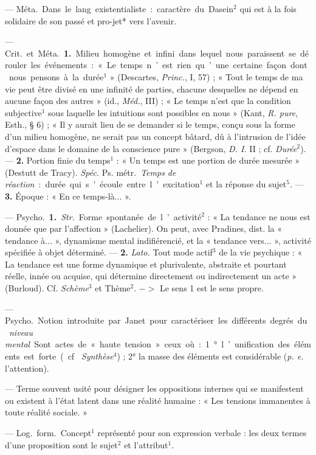 \begin{itemize}[leftmargin=1cm, label=, itemsep=1pt]
 — \si{Méta.} Dans le lang. existentialiste : caractère du
Dasein$^2$ qui est à la fois solidaire de son passé et pro-jet* vers l'avenir.

 — \si{Crit.} et \si{Méta.} {\bf 1.} Milieu homogène et infini dans
lequel nous paraissent se dérouler les événements :
« Le temps n’est rien qu’une certaine façon dont nous pensons à la durée$^1$
» (Descartes, {\it Princ.}, I, 57) ; « Tout le temps de ma vie peut être
divisé en une infinité de parties, chacune desquelles ne dépend en aucune
façon des autres » (id., {\it Méd.}, III) ; « Le temps n’est que la condition
subjective$^1$ sous laquelle les intuitions sont possibles en nous » (Kant,
{\it R. pure}, Esth., § 6) ; « Il y aurait lieu de se demander si le temps,
conçu sous la forme d’un milieu homogène, ne serait pas un concept bâtard, dû
à l’intrusion de l’idée d'espace dans le domaine de la conscience pure
» (Bergson, {\it D. I.} II ; cf. {\it Durée}$^2$). — {\bf 2.} Portion finie
du temps$^1$ : « Un temps est une portion de durée mesurée » (Destutt de
Tracy). {\it Spéc.} \si{Ps. métr.} {\it Temps de réaction} : durée qui
s'écoule entre l'excitation$^1$ et la réponse du sujet$^5$. — {\bf 3.}
Époque : « En ce temps-là... ».

 — \si{Psycho.} {\bf 1.} {\it Str.} Forme spontanée de
l’activité$^2$ : « La tendance ne nous est donnée que par l’affection
» (Lachelier). On peut, avec Pradines, dist. la « tendance à... », dynamisme
mental indifiérencié, et la « tendance vers... », activité spécifiée à objet
déterminé. — {\bf 2.} {\it Lato.} Tout mode actif$^3$ de la vie psychique : «
La tendance est une forme dynamique et plurivalente, abstraite et pourtant
réelle, innée ou acquise, qui détermine directement ou indirectement un acte
» (Burloud). Cf. {\it Schème}$^3$ et Thème$^2$. $->$ Le sens 1 est le sens
propre.

 — \si{Psycho.} Notion introduite par Janet pour
caractériser les différents degrés du {\it niveau mental}. Sont actes de «
haute tension » ceux où : 1° l’unification des éléments est forte (cf. {\it
Synthèse}$^4$) ; 2° la masse des éléments est considérable ({\it p. e.}
l'attention).

 — Terme souvent usité pour désigner les oppositions internes
qui se manifestent ou existent à l’état latent dans une réalité humaine : «
Les tensions immanentes à toute réalité sociale. »

 — \si{Log.} \si{form.} Concept$^1$ représenté pour son expression
verbale : les deux termes d’une proposition sont le sujet$^2$ et
l’attribut$^1$.


\end{itemize}
